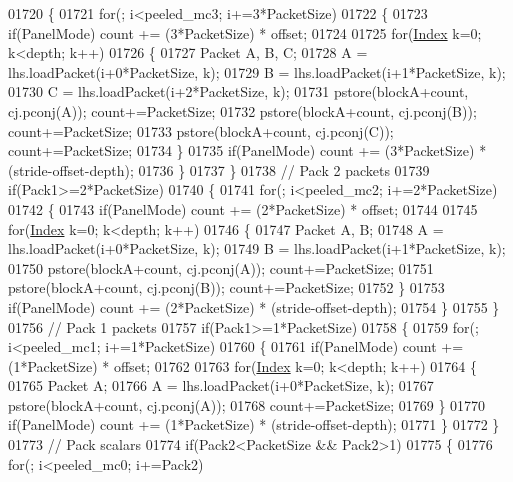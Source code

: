 \begin{DoxyCode}
01720   \{
01721     \textcolor{keywordflow}{for}(; i<peeled\_mc3; i+=3*PacketSize)
01722     \{
01723       \textcolor{keywordflow}{if}(PanelMode) count += (3*PacketSize) * offset;
01724 
01725       \textcolor{keywordflow}{for}(\hyperlink{namespace_eigen_a62e77e0933482dafde8fe197d9a2cfde}{Index} k=0; k<depth; k++)
01726       \{
01727         Packet A, B, C;
01728         A = lhs.loadPacket(i+0*PacketSize, k);
01729         B = lhs.loadPacket(i+1*PacketSize, k);
01730         C = lhs.loadPacket(i+2*PacketSize, k);
01731         pstore(blockA+count, cj.pconj(A)); count+=PacketSize;
01732         pstore(blockA+count, cj.pconj(B)); count+=PacketSize;
01733         pstore(blockA+count, cj.pconj(C)); count+=PacketSize;
01734       \}
01735       \textcolor{keywordflow}{if}(PanelMode) count += (3*PacketSize) * (stride-offset-depth);
01736     \}
01737   \}
01738   \textcolor{comment}{// Pack 2 packets}
01739   \textcolor{keywordflow}{if}(Pack1>=2*PacketSize)
01740   \{
01741     \textcolor{keywordflow}{for}(; i<peeled\_mc2; i+=2*PacketSize)
01742     \{
01743       \textcolor{keywordflow}{if}(PanelMode) count += (2*PacketSize) * offset;
01744 
01745       \textcolor{keywordflow}{for}(\hyperlink{namespace_eigen_a62e77e0933482dafde8fe197d9a2cfde}{Index} k=0; k<depth; k++)
01746       \{
01747         Packet A, B;
01748         A = lhs.loadPacket(i+0*PacketSize, k);
01749         B = lhs.loadPacket(i+1*PacketSize, k);
01750         pstore(blockA+count, cj.pconj(A)); count+=PacketSize;
01751         pstore(blockA+count, cj.pconj(B)); count+=PacketSize;
01752       \}
01753       \textcolor{keywordflow}{if}(PanelMode) count += (2*PacketSize) * (stride-offset-depth);
01754     \}
01755   \}
01756   \textcolor{comment}{// Pack 1 packets}
01757   \textcolor{keywordflow}{if}(Pack1>=1*PacketSize)
01758   \{
01759     \textcolor{keywordflow}{for}(; i<peeled\_mc1; i+=1*PacketSize)
01760     \{
01761       \textcolor{keywordflow}{if}(PanelMode) count += (1*PacketSize) * offset;
01762 
01763       \textcolor{keywordflow}{for}(\hyperlink{namespace_eigen_a62e77e0933482dafde8fe197d9a2cfde}{Index} k=0; k<depth; k++)
01764       \{
01765         Packet A;
01766         A = lhs.loadPacket(i+0*PacketSize, k);
01767         pstore(blockA+count, cj.pconj(A));
01768         count+=PacketSize;
01769       \}
01770       \textcolor{keywordflow}{if}(PanelMode) count += (1*PacketSize) * (stride-offset-depth);
01771     \}
01772   \}
01773   \textcolor{comment}{// Pack scalars}
01774   \textcolor{keywordflow}{if}(Pack2<PacketSize && Pack2>1)
01775   \{
01776     \textcolor{keywordflow}{for}(; i<peeled\_mc0; i+=Pack2)

\end{DoxyCode}
